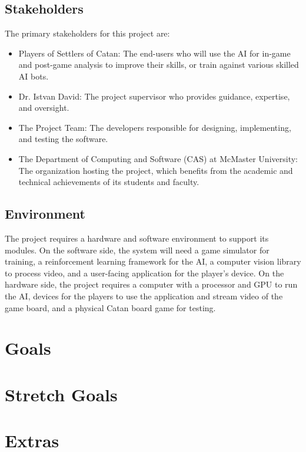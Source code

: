 \documentclass{article}
\begin{document}
\subsection{Stakeholders}
The primary stakeholders for this project are:
\begin{itemize}
    \item Players of Settlers of Catan: The end-users who will use the AI for in-game and post-game analysis to improve their skills, or train against various skilled AI bots.
    \item Dr. Istvan David: The project supervisor who provides guidance, expertise, and oversight.
    \item The Project Team: The developers responsible for designing, implementing, and testing the software.
    \item The Department of Computing and Software (CAS) at McMaster University: The organization hosting the project, which benefits from the academic and technical achievements of its students and faculty.
\end{itemize}

\subsection{Environment}
The project requires a hardware and software environment to support its modules. On the software side, the system will need a game simulator for training, a reinforcement learning framework for the AI, a computer vision library to process video, and a user-facing application for the player's device. On the hardware side, the project requires a computer with a processor and GPU to run the AI, devices for the players to use the application and stream video of the game board, and a physical Catan board game for testing.

\section{Goals}

\section{Stretch Goals}

\section{Extras}

\end{document}
